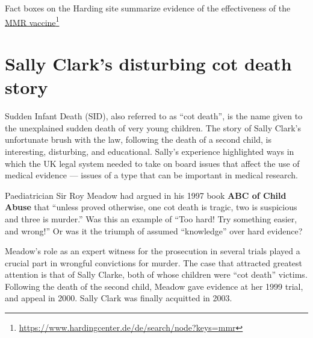 \documentclass[
  10ptls,
  b5paper]{book}
\begin{document}
Fact boxes on the Harding site summarize evidence of the effectiveness of the \href{https://www.hardingcenter.de/de/search/node?keys=mmr}{MMR vaccine}\footnote{\url{https://www.hardingcenter.de/de/search/node?keys=mmr}}

\section{Sally Clark's disturbing cot death story}\label{sally-clarks-disturbing-cot-death-story}

Sudden Infant Death (SID), also referred to as ``cot death'', is the name given to the unexplained sudden death of very young children. The story of Sally Clark's unfortunate brush with the law, following the death of a second child, is interesting, disturbing, and educational. Sally's experience highlighted ways in which the UK legal system needed to take on board issues that affect the use of medical evidence --- issues of a type that can be important in medical research.

Paediatrician Sir Roy Meadow had argued in his 1997 book \textbf{ABC of Child Abuse} that ``unless proved otherwise, one cot death is tragic, two is suspicious and three is murder.'' Was this an example of ``Too hard! Try something easier, and wrong!'' Or was it the triumph of assumed ``knowledge'' over hard evidence?

Meadow's role as an expert witness for the prosecution in several trials played a crucial part in wrongful convictions for murder. The case that attracted greatest attention is that of Sally Clarke, both of whose children were ``cot death'' victims. Following the death of the second child, Meadow gave evidence at her 1999 trial, and appeal in 2000. Sally Clark was finally acquitted in 2003.
\end{document}
